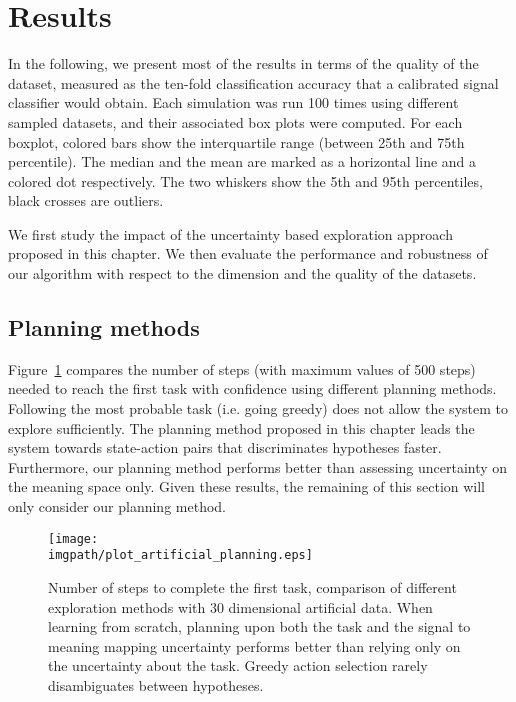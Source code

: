 \section{Results}
\label{chapter:planning:results}

In the following, we present most of the results in terms of the quality of the dataset, measured as the ten-fold classification accuracy that a calibrated signal classifier would obtain. Each simulation was run 100 times using different sampled datasets, and their associated box plots were computed. For each boxplot, colored bars show the interquartile range (between 25th and 75th percentile). The median and the mean are marked as a horizontal line and a colored dot respectively. The two whiskers show the 5th and 95th percentiles, black crosses are outliers. 

We first study the impact of the uncertainty based exploration approach proposed in this chapter. We then evaluate the performance and robustness of our algorithm with respect to the dimension and the quality of the datasets.

\subsection{Planning methods}

Figure~\ref{fig:artificialplanning} compares the number of steps (with maximum values of 500 steps) needed to reach the first task with confidence using different planning methods. Following the most probable task (i.e. going greedy) does not allow the system to explore sufficiently. The planning method proposed in this chapter leads the system towards state-action pairs that discriminates hypotheses faster. Furthermore, our planning method performs better than assessing uncertainty on the meaning space only. Given these results, the remaining of this section will only consider our planning method.

\begin{figure}[!htbp]
  \centering
      \texttt{[image: \\imgpath/plot\_artificial\_planning.eps]}
      \caption{Number of steps to complete the first task, comparison of different exploration methods with 30 dimensional artificial data. When learning from scratch, planning upon both the task and the signal to meaning mapping uncertainty performs better than relying only on the uncertainty about the task. Greedy action selection rarely disambiguates between hypotheses.}
    \label{fig:artificialplanning}
\end{figure}

